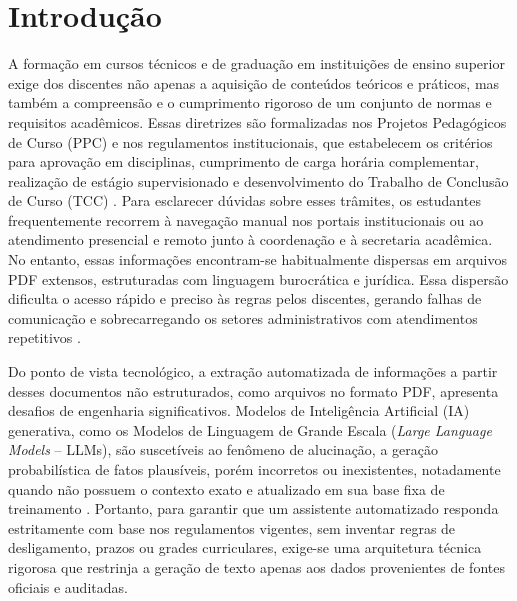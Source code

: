 \documentclass[12pt]{article}
\begin{document}
%


\section{Introdução}

A formação em cursos técnicos e de graduação em instituições de ensino superior exige dos discentes não apenas a aquisição de conteúdos teóricos e práticos, mas também a compreensão e o cumprimento rigoroso de um conjunto de normas e requisitos acadêmicos. Essas diretrizes são formalizadas nos Projetos Pedagógicos de Curso (PPC) e nos regulamentos institucionais, que estabelecem os critérios para aprovação em disciplinas, cumprimento de carga horária complementar, realização de estágio supervisionado e desenvolvimento do Trabalho de Conclusão de Curso (TCC) \cite{ppcourobranco}. Para esclarecer dúvidas sobre esses trâmites, os estudantes frequentemente recorrem à navegação manual nos portais institucionais ou ao atendimento presencial e remoto junto à coordenação e à secretaria acadêmica. No entanto, essas informações encontram-se habitualmente dispersas em arquivos PDF extensos, estruturadas com linguagem burocrática e jurídica. Essa dispersão dificulta o acesso rápido e preciso às regras pelos discentes, gerando falhas de comunicação e sobrecarregando os setores administrativos com atendimentos repetitivos \cite{monteiro2021helena}.

Do ponto de vista tecnológico, a extração automatizada de informações a partir desses documentos não estruturados, como arquivos no formato PDF, apresenta desafios de engenharia significativos. Modelos de Inteligência Artificial (IA) generativa, como os Modelos de Linguagem de Grande Escala (\textit{Large Language Models} -- LLMs), são suscetíveis ao fenômeno de alucinação, a geração probabilística de fatos plausíveis, porém incorretos ou inexistentes, notadamente quando não possuem o contexto exato e atualizado em sua base fixa de treinamento \cite{modran2025leveraging}. Portanto, para garantir que um assistente automatizado responda estritamente com base nos regulamentos vigentes, sem inventar regras de desligamento, prazos ou grades curriculares, exige-se uma arquitetura técnica rigorosa que restrinja a geração de texto apenas aos dados provenientes de fontes oficiais e auditadas.
\end{document}
